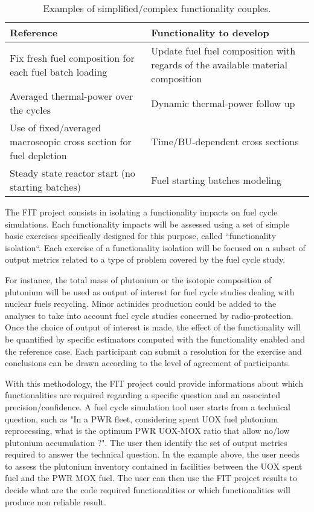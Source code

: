 \begin{table}[h]
\centering
\begin{tabular}{ |p{}|p{}| }
  \hline
  Reference & Functionality to develop 
  \\ \hline
  Fix fresh fuel composition for each fuel batch loading 
  & Update fuel fuel composition with regards of the available material
  composition 
  \\ \hline
  Averaged thermal-power over the cycles 
  & Dynamic thermal-power follow up
  \\ \hline
  Use of fixed/averaged macroscopic cross section for fuel depletion
  & Time/\gls{BU}-dependent cross sections
  \\ \hline
  Steady state reactor start (no starting batches)
  & Fuel starting batches modeling \\
  \hline
\end{tabular}
\label{Tab:Funct}
\caption{Examples of simplified/complex functionality couples.}
\end{table}


The FIT project consists in isolating a functionality impacts on fuel
cycle simulations. Each functionality impacts will be assessed using a set of
simple basic exercises specifically designed for this purpose, called
``functionality isolation``. Each exercise of a functionality isolation will be
focused on a subset of output metrics related to a type of problem covered by
the fuel cycle study.  

For instance, the total mass of plutonium or the isotopic composition of
plutonium will be used as output of interest for fuel cycle studies dealing with 
nuclear fuels recycling. Minor actinides production could be added to the
analyses to take into account fuel cycle studies concerned by radio-protection.
Once the choice of output of interest is made, the effect of the functionality
will be quantified by specific estimators computed with the functionality
enabled and the reference case. Each participant can submit a resolution for the
exercise and conclusions can be drawn according to the level of agreement
of participants.

With this methodology, the FIT project could provide informations about which
functionalities are required regarding a specific question and an associated
precision/confidence.  A fuel cycle simulation tool user starts from a technical
question, such as "In a \gls{PWR} fleet, considering spent \gls{UOX} fuel plutonium
reprocessing, what is the optimum \gls{PWR} \gls{UOX}-\gls{MOX} ratio that allow no/low plutonium
accumulation ?". The user then identify the set of output metrics required to
answer the technical question. In the example above, the user needs to assess
the plutonium inventory contained in facilities between the \gls{UOX} spent fuel and
the \gls{PWR} \gls{MOX} fuel. The user can then use the FIT project results to decide what
are the code required functionalities or which functionalities will produce non
reliable result. 


